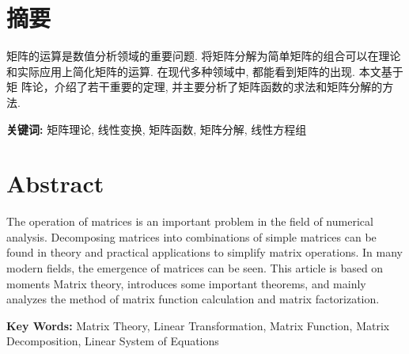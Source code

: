 \section*{ \centering 摘要}

\vskip0.5cm
矩阵的运算是数值分析领域的重要问题. 将矩阵分解为简单矩阵的组合可以在理论
和实际应用上简化矩阵的运算. 在现代多种领域中, 都能看到矩阵的出现. 本文基于矩
阵论，介绍了若干重要的定理, 并主要分析了矩阵函数的求法和矩阵分解的方法.
\cite{王辉2011矩阵理论以及应用}
\cite[]{矩阵论}

\textbf{关键词:} 矩阵理论, 线性变换, 矩阵函数, 矩阵分解, 线性方程组

\clearpage
\section*{ \centering \textbf{Abstract} }

The operation of matrices is an important problem in the field of numerical analysis.
Decomposing matrices into combinations of simple matrices can be found in theory and
practical applications to simplify matrix operations. In many modern fields, the emergence
of matrices can be seen. This article is based on moments Matrix theory, introduces
some important theorems, and mainly analyzes the method of matrix function calculation
and matrix factorization.

\textbf{Key Words:} Matrix Theory, Linear Transformation, Matrix Function, Matrix Decomposition, Linear System of Equations




